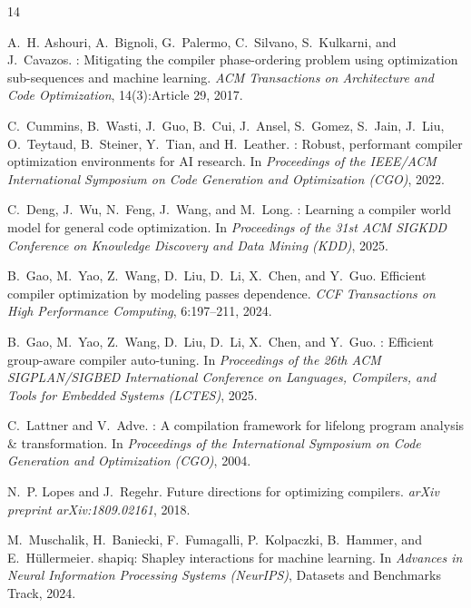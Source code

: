 \documentclass[preprint]{article}
\begin{document}
\begin{thebibliography}{14}

A.~H. Ashouri, A.~Bignoli, G.~Palermo, C.~Silvano, S.~Kulkarni, and J.~Cavazos.
: Mitigating the compiler phase-ordering problem using optimization sub-sequences and machine learning.
\newblock \emph{ACM Transactions on Architecture and Code Optimization}, 14(3):Article 29, 2017.

C.~Cummins, B.~Wasti, J.~Guo, B.~Cui, J.~Ansel, S.~Gomez, S.~Jain, J.~Liu, O.~Teytaud, B.~Steiner, Y.~Tian, and H.~Leather.
: Robust, performant compiler optimization environments for {AI} research.
\newblock In \emph{Proceedings of the IEEE/ACM International Symposium on Code Generation and Optimization (CGO)}, 2022.

C.~Deng, J.~Wu, N.~Feng, J.~Wang, and M.~Long.
: Learning a compiler world model for general code optimization.
\newblock In \emph{Proceedings of the 31st ACM SIGKDD Conference on Knowledge Discovery and Data Mining (KDD)}, 2025.

B.~Gao, M.~Yao, Z.~Wang, D.~Liu, D.~Li, X.~Chen, and Y.~Guo.
\newblock Efficient compiler optimization by modeling passes dependence.
\newblock \emph{CCF Transactions on High Performance Computing}, 6:197--211, 2024.

B.~Gao, M.~Yao, Z.~Wang, D.~Liu, D.~Li, X.~Chen, and Y.~Guo.
: Efficient group-aware compiler auto-tuning.
\newblock In \emph{Proceedings of the 26th ACM SIGPLAN/SIGBED International Conference on Languages, Compilers, and Tools for Embedded Systems (LCTES)}, 2025.

C.~Lattner and V.~Adve.
: A compilation framework for lifelong program analysis \& transformation.
\newblock In \emph{Proceedings of the International Symposium on Code Generation and Optimization (CGO)}, 2004.

N.~P. Lopes and J.~Regehr.
\newblock Future directions for optimizing compilers.
\newblock \emph{arXiv preprint arXiv:1809.02161}, 2018.

M.~Muschalik, H.~Baniecki, F.~Fumagalli, P.~Kolpaczki, B.~Hammer, and E.~H\"ullermeier.
\newblock shapiq: {S}hapley interactions for machine learning.
\newblock In \emph{Advances in Neural Information Processing Systems (NeurIPS)}, Datasets and Benchmarks Track, 2024.


\end{thebibliography}
\end{document}
